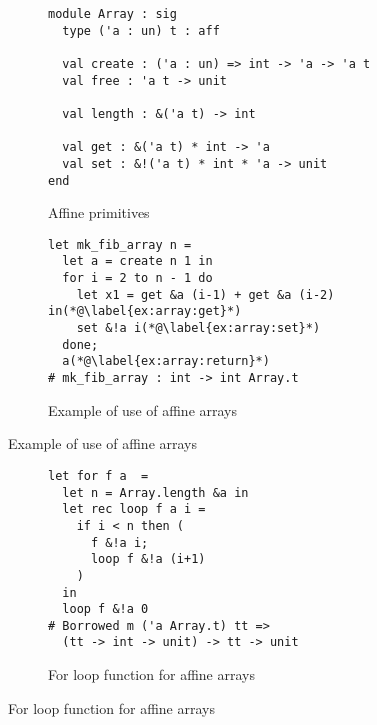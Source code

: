 \begin{figure}
  \centering
  \begin{subfigure}{0.48\linewidth}
\begin{lstlisting}
module Array : sig
  type ('a : un) t : aff
  
  val create : ('a : un) => int -> 'a -> 'a t
  val free : 'a t -> unit

  val length : &('a t) -> int

  val get : &('a t) * int -> 'a
  val set : &!('a t) * int * 'a -> unit
end
\end{lstlisting}
    \caption{Affine primitives}
    \label{sig:array}
  \end{subfigure}\hfill
  \begin{subfigure}{0.5\linewidth}
\begin{lstlisting}
let mk_fib_array n =
  let a = create n 1 in
  for i = 2 to n - 1 do
    let x1 = get &a (i-1) + get &a (i-2) in(*@\label{ex:array:get}*)
    set &!a i(*@\label{ex:array:set}*)
  done;
  a(*@\label{ex:array:return}*)
# mk_fib_array : int -> int Array.t
\end{lstlisting}
    \caption{Example of use of affine arrays}
    \label{ex:array}
  \end{subfigure}
\end{figure}

\begin{figure}
  \centering
  \begin{subfigure}{0.5\linewidth}
\begin{lstlisting}
let for f a  = 
  let n = Array.length &a in
  let rec loop f a i = 
    if i < n then (
      f &!a i;
      loop f &!a (i+1)
    )
  in
  loop f &!a 0
# Borrowed m ('a Array.t) tt =>
  (tt -> int -> unit) -> tt -> unit
\end{lstlisting}
    \caption{For loop function for affine arrays}
    \label{ex:array}
  \end{subfigure}
\end{figure}

